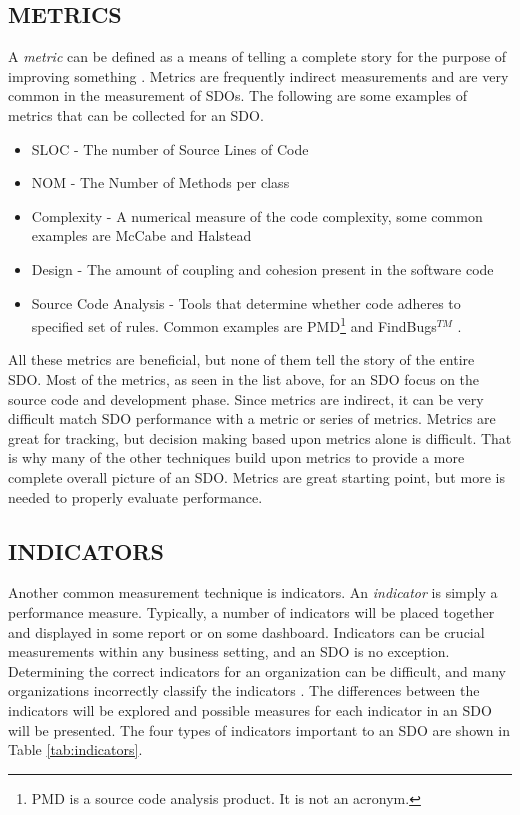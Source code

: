 \documentclass[SDSUThesis.tex]{subfiles}
\begin{document}
    \subsection{METRICS}
        A \textit{metric} can be defined as a means of telling a complete story
        for the purpose of improving something \cite{Klubeck2011}.  Metrics are
        frequently indirect measurements and
        are very common in the measurement of SDOs.  
        The following are some examples of metrics that can be collected 
        for an SDO. 
        \begin{itemize}
            \item SLOC - The number of Source Lines of Code 
            \item NOM - The Number of Methods per class
            \item Complexity - A numerical measure of the code complexity,
                some common examples are McCabe \cite{McCabe1976} and 
                Halstead \cite{Halstead1977}
            \item Design - The amount of coupling and cohesion present 
                in the software code
            \item Source Code Analysis - Tools that determine whether 
                code adheres to specified set of rules. Common 
                examples are PMD\footnote{PMD is a source code analysis product.  
                It is not an acronym.} and FindBugs$^{TM}$ \cite{PMD, Findbugs}.
        \end{itemize}
        All these metrics are beneficial, but none of them tell the story of the entire
        SDO.  Most of the metrics, as seen in the list above, for an SDO focus on 
        the source code and development phase. 
        Since metrics are indirect, it can be very difficult match SDO performance with
        a metric or series of metrics.  Metrics are great for tracking, but decision making
        based upon metrics alone is difficult.  That is why many of the other techniques
        build upon metrics to provide a more complete overall picture of an SDO. Metrics are great starting point, but more is needed to properly 
        evaluate performance. 

    \subsection{INDICATORS}
    \label{sec:indicators}
        Another common measurement technique is indicators. An
        \textit{indicator} is simply a performance measure. 
        Typically, a number of indicators will be placed
        together and displayed in some report or on some
        dashboard. 
        Indicators can be crucial measurements
        within any business setting, and an SDO is no exception. Determining
        the correct indicators for an organization can
        be difficult, and many organizations incorrectly classify
        the indicators \cite{parmenter2010}.  
        The differences between the indicators will be explored and
        possible measures for each indicator in an SDO will be
        presented.   The four
        types of indicators important to an SDO are shown
        in Table \ref{tab:indicators}.
        
\end{document}
